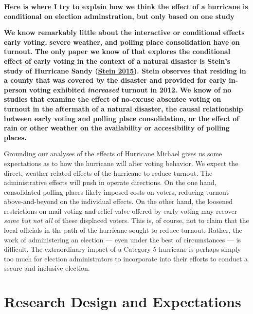 \documentclass[
  12pt,
]{article}
\begin{document}
\textbf{Here is where I try to explain how we think the effect of a hurricane is conditional on election adminstration, but only based on one study}

\textbf{We know remarkably little about the interactive or conditional effects early voting, severe weather, and polling place consolidation have on turnout. The only paper we know of that explores the conditional effect of early voting in the context of a natural disaster is Stein's study of Hurricane Sandy (\protect\hyperlink{ref-Stein2015}{Stein 2015}). Stein observes that residing in a county that was covered by the disaster and provided for early in-person voting exhibited \emph{increased} turnout in 2012. We know of no studies that examine the effect of no-excuse absentee voting on turnout in the aftermath of a natural disaster, the causal relationship between early voting and polling place consolidation, or the effect of rain or other weather on the availability or accessibility of polling places.}

Grounding our analyses of the effects of Hurricane Michael gives us some expectations as to how the hurricane will alter voting behavior. We expect the direct, weather-related effects of the hurricane to reduce turnout. The administrative effects will push in operate directions. On the one hand, consolidated polling places likely imposed costs on voters, reducing turnout above-and-beyond on the individual effects. On the other hand, the loosened restrictions on mail voting and relief valve offered by early voting may recover \emph{some but not all} of these displaced voters. This is, of course, not to claim that the local officials in the path of the hurricane sought to reduce turnout. Rather, the work of administering an election --- even under the best of circumstances --- is difficult. The extraordinary impact of a Category 5 hurricane is perhaps simply too much for election administrators to incorporate into their efforts to conduct a secure and inclusive election.

\hypertarget{research-design-and-expectations}{%
\section*{Research Design and Expectations}\label{research-design-and-expectations}}
\end{document}
